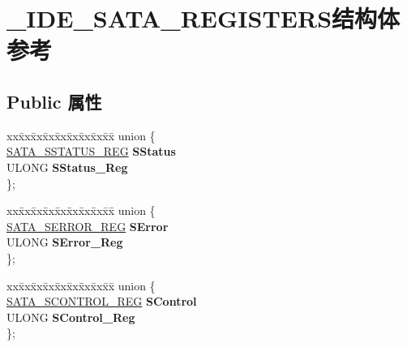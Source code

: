 \hypertarget{struct___i_d_e___s_a_t_a___r_e_g_i_s_t_e_r_s}{}\section{\+\_\+\+I\+D\+E\+\_\+\+S\+A\+T\+A\+\_\+\+R\+E\+G\+I\+S\+T\+E\+R\+S结构体 参考}
\label{struct___i_d_e___s_a_t_a___r_e_g_i_s_t_e_r_s}
\subsection*{Public 属性}
\begin{DoxyCompactItemize}
\item 
\mbox{\label{struct___i_d_e___s_a_t_a___r_e_g_i_s_t_e_r_s_a268966a7b032468d20e744edc2cb3e20}} 
\begin{tabbing}
xx\=xx\=xx\=xx\=xx\=xx\=xx\=xx\=xx\=\kill
union \{\\
\>\hyperlink{union___s_a_t_a___s_s_t_a_t_u_s___r_e_g}{SATA\_SSTATUS\_REG} {\bfseries SStatus}\\
\>ULONG {\bfseries SStatus\_Reg}\\
\}; \\

\end{tabbing}\item 
\mbox{\label{struct___i_d_e___s_a_t_a___r_e_g_i_s_t_e_r_s_a9c8bb24dd5cef99a75dba4a36a32abd0}} 
\begin{tabbing}
xx\=xx\=xx\=xx\=xx\=xx\=xx\=xx\=xx\=\kill
union \{\\
\>\hyperlink{union___s_a_t_a___s_e_r_r_o_r___r_e_g}{SATA\_SERROR\_REG} {\bfseries SError}\\
\>ULONG {\bfseries SError\_Reg}\\
\}; \\

\end{tabbing}\item 
\mbox{\label{struct___i_d_e___s_a_t_a___r_e_g_i_s_t_e_r_s_a67b71db5253e75697175c2dc41c51cc9}} 
\begin{tabbing}
xx\=xx\=xx\=xx\=xx\=xx\=xx\=xx\=xx\=\kill
union \{\\
\>\hyperlink{union___s_a_t_a___s_c_o_n_t_r_o_l___r_e_g}{SATA\_SCONTROL\_REG} {\bfseries SControl}\\
\>ULONG {\bfseries SControl\_Reg}\\
\}; \\


\end{tabbing}
\end{DoxyCompactItemize}
